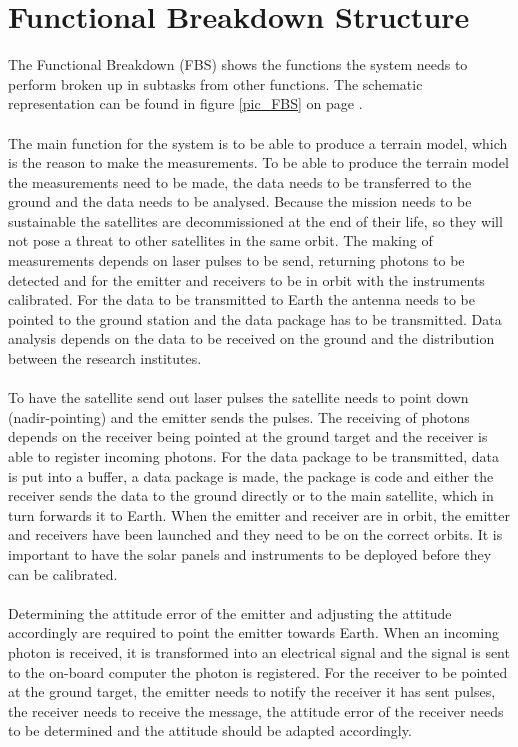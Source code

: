 \section{Functional Breakdown Structure}
\label{section_FBS}
The Functional Breakdown (FBS) shows the functions the system needs to perform broken up in subtasks from other functions. The schematic representation can be found in figure \ref{pic_FBS} on page \pageref{pic_FBS}.
\\ \\
The main function for the system is to be able to produce a terrain model, which is the reason to make the measurements. To be able to produce the terrain model the measurements need to be made, the data needs to be transferred to the ground and the data needs to be analysed. Because the mission needs to be sustainable the satellites are decommissioned at the end of their life, so they will not pose a threat to other satellites in the same orbit.
The making of measurements depends on laser pulses to be send, returning photons to be detected and for the emitter and receivers to be in orbit with the instruments calibrated. For the data to be transmitted to Earth the antenna needs to be pointed to the ground station and the data package has to be transmitted. Data analysis depends on the data to be received on the ground and the distribution between the research institutes.
\\ \\
To have the satellite send out laser pulses the satellite needs to point down (nadir-pointing) and the emitter sends the pulses. The receiving of photons depends on the receiver being pointed at the ground target and the receiver is able to register incoming photons. For the data package to be transmitted, data is put into a buffer, a data package is made, the package is code and either the receiver sends the data to the ground directly or to the main satellite, which in turn forwards it to Earth. When the emitter and receiver are in orbit, the emitter and receivers have been launched and they need to be on the correct orbits. It is important to have the solar panels and instruments to be deployed before they can be calibrated.
\\ \\
Determining the attitude error of the emitter and adjusting the attitude accordingly are required to point the emitter towards Earth. When an incoming photon is received, it is transformed into an electrical signal and the signal is sent to the on-board computer the photon is registered. For the receiver to be pointed at the ground target, the emitter needs to notify the receiver it has sent pulses, the receiver needs to receive the message, the attitude error of the receiver needs to be determined and the attitude should be adapted accordingly. 

